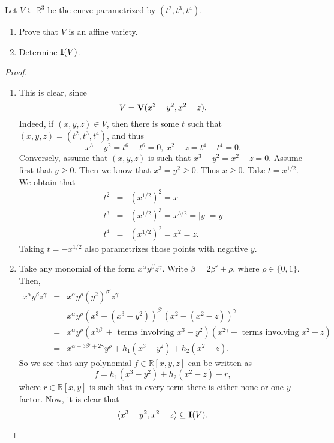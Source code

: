 \begin{exercise}{12}
Let $V\subseteq \mathbb{R}^3$ be the curve parametrized by $(t^2, t^3, t^4)$.
\begin{enumerate}
    \item Prove that $V$ is an affine variety.
    \item Determine $\mathbf{I}(V)$.
\end{enumerate}
\end{exercise}
\begin{proof}
        \begin{enumerate}
        \item This is clear, since 
        $$V = \mathbf{V}(x^3 - y^2, x^2 - z).$$
        Indeed, if $(x,y,z)\in V$, then there is some $t$ such that $(x,y,z) = (t^2,t^3,t^4)$, and thus
        $$x^3 - y^2 = t^6 - t^6 = 0,~x^2 - z = t^4 - t^4 = 0.$$
        Conversely, assume that $(x,y,z)$ is such that $x^3 - y^2 = x^2 - z = 0$. Assume first that $y\geq 0$. Then we know that $x^3 = y^2 \geq 0$. Thus $x\geq 0$. Take $t = x^{1/2}$. We obtain that
        \begin{eqnarray*}
            t^2 & = & (x^{1/2})^2 = x\\
            t^3 & = & (x^{1/2})^3 = x^{3/2} = |y| = y\\
            t^4 & = & (x^{1/2})^2 = x^2 = z.
        \end{eqnarray*}
        Taking $t = -x^{1/2}$ also parametrizes those points with negative $y$.
        \item Take any monomial of the form $x^\alpha y^\beta z^\gamma$. Write $\beta = 2\beta' + \rho$, where $\rho\in \{0,1\}$. Then,
        \begin{eqnarray*}
            x^\alpha y^\beta z^\gamma 
            & = & x^\alpha y^\rho (y^2)^{\beta'} z^\gamma\\
            & = & x^\alpha y^\rho (x^3 - (x^3 - y^2))^{\beta'} (x^2 - (x^2 - z))^\gamma\\
            & = & x^\alpha y^\rho (x^{3\beta'} + \text{ terms involving } x^3 - y^2)(x^{2\gamma} + \text{ terms involving } x^2 - z)\\
            & = & x^{\alpha + 3\beta' + 2\gamma} y^\rho + h_1(x^3 - y^2) + h_2(x^2 - z).
        \end{eqnarray*}
        So we see that any polynomial $f\in \mathbb{R}[x,y,z]$ can be written as
        $$f = h_1(x^3 - y^2) + h_2(x^2 - z) + r,$$
        where $r\in \mathbb{R}[x,y]$ is such that in every term there is either none or one $y$ factor. Now, it is clear that
        $$\langle x^3 - y^2, x^2 - z\rangle\subseteq \mathbf{I}(V).$$

\end{enumerate}
\end{proof}
